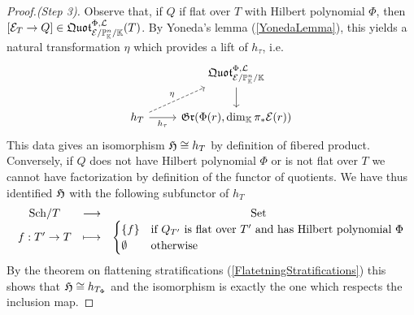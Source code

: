 \begin{proof}[Proof.(Step 3)]
Observe that, if $Q$ if flat over $T$ with Hilbert polynomial $\Phi$, then $[\mathcal{E}_T\to Q]\in \mathfrak{Quot}^{\Phi,\mathcal{L}}_{\mathcal{E}/\mathbb{P}^n_{\mathbb{K}}/\mathbb{K}}(T)$. By Yoneda's lemma (\ref{YonedaLemma}), this yields a natural transformation $\eta$ which provides a lift of $h_\tau$, i.e.
\[\begin{tikzcd}
	& {\quotf^{\Phi,\Lc}_{\Ec/\Pj^n_\K/\K}} \\
	{h_T} & {\gr(\Phi(r),\dim_\K\pi_\ast\Ec(r))}
	\arrow[from=1-2, to=2-2]
	\arrow["\eta", dashed, from=2-1, to=1-2]
	\arrow["{h_\tau}"', from=2-1, to=2-2]
\end{tikzcd}\]
This data gives an isomorphism $\mathfrak{H}\cong h_T$ by definition of fibered product. Conversely, if $Q$ does not have Hilbert polynomial $\Phi$ or is not flat over $T$ we cannot have factorization by definition of the functor of quotients. We have thus identified $\mathfrak{H}$ with the following subfunctor of $h_T$
\[\begin{array}{ccc} {{\mathrm{Sch}}/{T}} & \longrightarrow & {\mathrm{Set}}\\ {f:T'\to T} & \longmapsto & {\begin{cases}
\left\{{f}\right\} &\text{if $Q_{T'}$ is flat over $T'$ and has Hilbert polynomial $\Phi$}
\\
\emptyset &\text{otherwise}
\end{cases}} \end{array}\]
By the theorem on flattening stratifications (\ref{FlatetningStratifications}) this shows that $\mathfrak{H}\cong h_{T_\Phi}$ and the isomorphism is exactly the one which respects the inclusion map.
\end{proof}